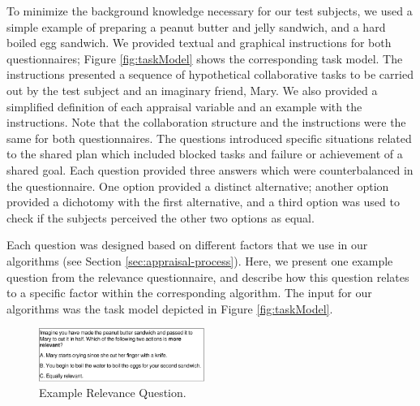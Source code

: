 \documentclass{article}
\begin{document}
To minimize the background knowledge necessary for our test subjects, we used a
simple example of preparing a peanut butter and jelly sandwich, and a hard
boiled egg sandwich. We provided textual and graphical instructions for
both questionnaires; Figure \ref{fig:taskModel} shows the corresponding task
model. The instructions presented a sequence of hypothetical collaborative tasks
to be carried out by the test subject and an imaginary friend, Mary. We also
provided a simplified definition of each appraisal variable and an example with
the instructions. Note that the collaboration structure and the instructions
were the same for both questionnaires. The questions introduced specific
situations related to the shared plan which included blocked tasks and failure
or achievement of a shared goal. Each question provided three answers which were
counterbalanced in the questionnaire. One option provided a distinct
alternative; another option provided a dichotomy with the first alternative, and
a third option was used to check if the subjects perceived the other two options
as equal.

Each question was designed based on different factors that we use in our
algorithms (see Section \ref{sec:appraisal-process}). Here, we present one
example question from the relevance questionnaire, and describe how this
question relates to a specific factor within the corresponding algorithm. The
input for our algorithms was the task model depicted in Figure
\ref{fig:taskModel}.

\begin{figure}[tbh]
  \vspace{-1mm}
  \centering
  \includegraphics[width=0.48\textwidth]{figure/question-sample4-croped.pdf}
  \vspace*{-7mm}
  \caption{{\fontsize{9}{9}\selectfont Example Relevance Question.}}
  \label{fig:qs1}
  \vspace{-4mm}
\end{figure}
\end{document}
